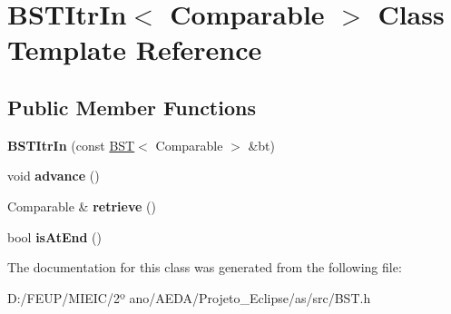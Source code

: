 \hypertarget{class_b_s_t_itr_in}{}\section{B\+S\+T\+Itr\+In$<$ Comparable $>$ Class Template Reference}
\label{class_b_s_t_itr_in}
\subsection*{Public Member Functions}
\begin{DoxyCompactItemize}
\item 
\mbox{\label{class_b_s_t_itr_in_ac836e2f560fed9cc7ef8e5431a2836cc}} 
{\bfseries B\+S\+T\+Itr\+In} (const \hyperlink{class_b_s_t}{B\+ST}$<$ Comparable $>$ \&bt)
\item 
\mbox{\label{class_b_s_t_itr_in_ac772d3ebbac748c5f8cf9bc659f2e32c}} 
void {\bfseries advance} ()
\item 
\mbox{\label{class_b_s_t_itr_in_ac7ac215c1247bd25fc1fdb8053826a32}} 
Comparable \& {\bfseries retrieve} ()
\item 
\mbox{\label{class_b_s_t_itr_in_a6f9a43217862c263a9bf15b9a08b889a}} 
bool {\bfseries is\+At\+End} ()
\end{DoxyCompactItemize}


The documentation for this class was generated from the following file\+:\begin{DoxyCompactItemize}
\item 
D\+:/\+F\+E\+U\+P/\+M\+I\+E\+I\+C/2º ano/\+A\+E\+D\+A/\+Projeto\+\_\+\+Eclipse/as/src/B\+S\+T.\+h\end{DoxyCompactItemize}
